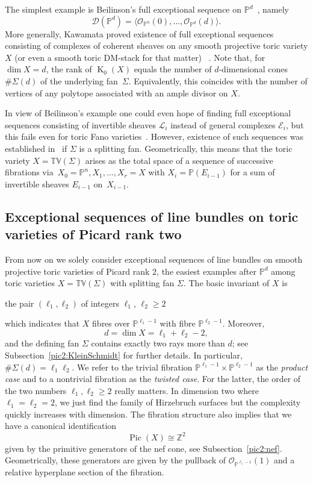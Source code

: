 \documentclass[11pt]{article}
\theoremstyle{definition}
\numberwithin{equation}{section}
\newcommand{\PP}{\mathbb P}
\newcommand{\T}{\mathbb T}
\newcommand{\V}{\mathbb V}
\newcommand{\Z}{\mathbb Z}
\newcommand{\CD}{{\mathcal D}}
\newcommand{\CE}{{\mathcal E}}
\newcommand{\CL}{{\mathcal L}}
\newcommand{\CO}{{\mathcal O}}
\newcommand{\toric}{\T\V}
\newcommand{\Pic}{\operatorname{Pic}}
\renewcommand{\sharp}{\#}
\newcommand{\ssect}[1]{Subsection~\ref{#1}}
\begin{document}
The simplest example is Beilinson's
full exceptional sequence on $\PP^{d}$~\cite{beilinson},
namely
$$
\CD(\PP^{d})=\langle\CO_{\PP^n}(0),\ldots,
\CO_{\PP^{d}}({d})\rangle.
$$
More generally, Kawamata proved existence of 
full exceptional sequences consisting of complexes 
of coherent sheaves on any smooth 
projective toric variety $X$ (or even a smooth 
toric DM-stack for that matter)
~\cite{kaw1,kaw2,kaw3}. Note that,
{for $\dim X = d$, }the 
rank of $\operatorname{K}_0(X)$ equals the number of 
$d$-dimensional cones $\sharp\Sigma(d)$ of the 
underlying fan~$\Sigma$. 
Equivalently, this coincides with the number of 
vertices of any polytope associated with an 
ample divisor on $X$. 

In view of Beilinson's example one could even 
hope of finding full exceptional sequences 
consisting of invertible sheaves 
$\CL_i$ instead of general complexes $\CE_i$, 
but this fails even for toric Fano 
varieties~\cite{efimov}. However, 
existence of such sequences was established 
in~\cite{CostaMiroRoig} if $\Sigma$ is a 
splitting fan. Geometrically, this means that the 
toric variety $X=\toric(\Sigma)$ arises as the 
total space of a sequence of successive fibrations 
via~$X_0=\PP^n,X_1,\ldots,X_r=X$ with 
$X_i=\PP(E_{i-1})$ for a sum of invertible sheaves 
$E_{i-1}$ on~$X_{i-1}$. 

\subsection{Exceptional sequences of line bundles on 
toric varieties of Picard rank two}
\label{subsec:CoSmToVaPic2}
From now on we solely consider exceptional sequences
of line bundles on smooth projective toric varieties 
of Picard rank $2$, the easiest examples { after 
$\PP^{d}$ among toric varieties $X=\toric(\Sigma)$ 
with splitting fan $\Sigma$.} 
The basic invariant of $X$ is 
\begin{center}
the pair $(\ell_1,\ell_2)$ of integers 
$\ell_1$, $\ell_2\geq2$  
\end{center}
which indicates that $X$ fibres over $\PP^{\ell_1-1}$ 
with fibre $\PP^{\ell_2-1}$. {Moreover,
\[
d=\dim X=\ell_1+\ell_2-2,  
\]
and} the defining fan $\Sigma$ 
contains exactly two rays more than $d$; see 
\ssect{pic2:KleinSchmidt} for further details. 
In particular, $\sharp\Sigma(d)=\ell_1\ell_2$.
We refer to the trivial fibration 
$\PP^{\ell_1-1}\times\PP^{\ell_2-1}$ as the 
{\em product case} and to a nontrivial fibration as 
the {\em twisted case}. For the latter, the order 
of the two numbers $\ell_1,\ell_2\geq 2$ really 
matters. In dimension two where $\ell_1=\ell_2=2$, 
we just find the family of Hirzebruch surfaces
but the complexity quickly increases with dimension. 
{The fibration structure also implies that 
we have a canonical identification 
$$
\Pic(X)\cong\Z^2 
$$
given by the primitive generators of the nef cone, 
see Subsection~\ref{pic2:nef}. Geometrically, 
these generators are given by the pullback of 
$\CO_{\PP^{\ell_1-1}}(1)$ and a relative hyperplane 
section of the fibration.}
\end{document}
